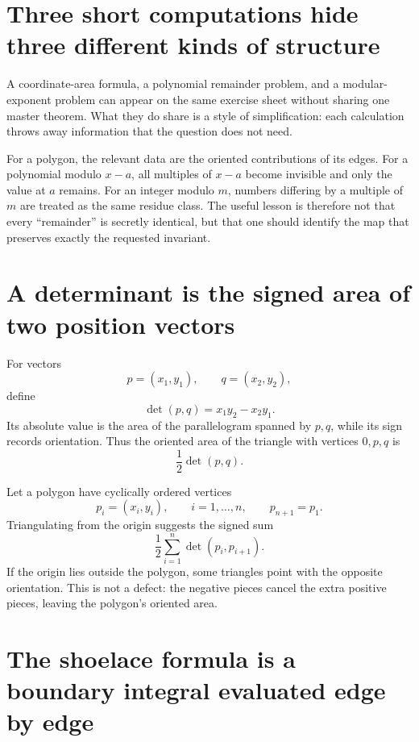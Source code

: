 
\section{Three short computations hide three different kinds of structure}

A coordinate-area formula, a polynomial remainder problem, and a modular-exponent problem can appear on the same exercise sheet without sharing one master theorem.  What they do share is a style of simplification: each calculation throws away information that the question does not need.

For a polygon, the relevant data are the oriented contributions of its edges.  For a polynomial modulo \(x-a\), all multiples of \(x-a\) become invisible and only the value at \(a\) remains.  For an integer modulo \(m\), numbers differing by a multiple of \(m\) are treated as the same residue class.  The useful lesson is therefore not that every ``remainder'' is secretly identical, but that one should identify the map that preserves exactly the requested invariant.

\section{A determinant is the signed area of two position vectors}

For vectors
\[
  p=(x_1,y_1),
  \qquad
  q=(x_2,y_2),
\]
define
\[
  \det(p,q)=x_1y_2-x_2y_1.
\]
Its absolute value is the area of the parallelogram spanned by \(p,q\), while its sign records orientation.  Thus the oriented area of the triangle with vertices \(0,p,q\) is
\[
  \frac12\det(p,q).
\]

Let a polygon have cyclically ordered vertices
\[
  p_i=(x_i,y_i),
  \qquad i=1,\ldots,n,
  \qquad p_{n+1}=p_1.
\]
Triangulating from the origin suggests the signed sum
\[
  \frac12\sum_{i=1}^n\det(p_i,p_{i+1}).
\]
If the origin lies outside the polygon, some triangles point with the opposite orientation.  This is not a defect: the negative pieces cancel the extra positive pieces, leaving the polygon's oriented area.

\section{The shoelace formula is a boundary integral evaluated edge by edge}

